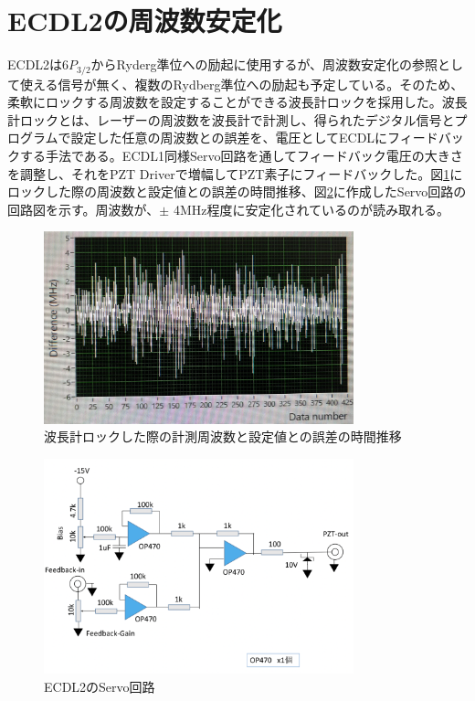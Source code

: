 \documentclass[dvipdfmx]{jsreport}
\begin{document}
\section{ECDL2の周波数安定化}
ECDL2は$6P_{3/2}$からRyderg準位への励起に使用するが、周波数安定化の参照として使える信号が無く、複数のRydberg準位への励起も予定している。そのため、柔軟にロックする周波数を設定することができる波長計ロックを採用した。波長計ロックとは、レーザーの周波数を波長計で計測し、得られたデジタル信号とプログラムで設定した任意の周波数との誤差を、電圧としてECDLにフィードバックする手法である。ECDL1同様Servo回路を通してフィードバック電圧の大きさを調整し、それをPZT Driverで増幅してPZT素子にフィードバックした。図\ref{fig:wave-lock}にロックした際の周波数と設定値との誤差の時間推移、図\ref{fig:wave-servo}に作成したServo回路の回路図を示す。周波数が、$\pm$ 4MHz程度に安定化されているのが読み取れる。

\begin{figure}[hbtp]
\centering
\includegraphics[width=0.8\textwidth]{images/wave_lock.jpg}
\caption{\label{fig:wave-lock}波長計ロックした際の計測周波数と設定値との誤差の時間推移}
\end{figure}

\begin{figure}[hbtp]
\centering
\includegraphics[width=0.8\textwidth]{images/wave_servo.png}
\caption{\label{fig:wave-servo}ECDL2のServo回路}
\end{figure}
\end{document}
